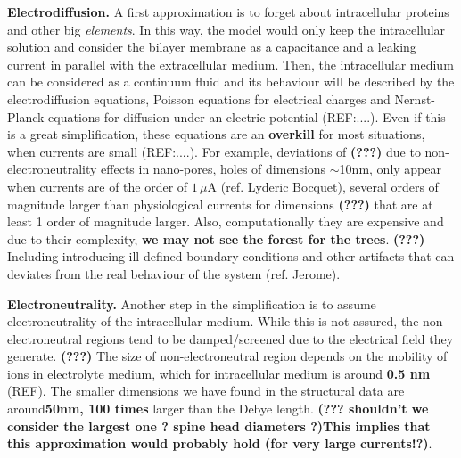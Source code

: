 \documentclass[10pt,letterpaper]{article}
\begin{document}
{\bf Electrodiffusion.} A first approximation is to forget about intracellular proteins and other big \emph{elements}. In this way, the model would only keep the intracellular solution and consider the bilayer membrane as a capacitance and a leaking current in parallel with the extracellular medium. Then, the intracellular medium can be considered as a continuum fluid and its behaviour will be described by the electrodiffusion equations, Poisson equations for electrical charges and Nernst-Planck equations for diffusion under an electric potential (REF:....). 
Even if this is  a great simplification, these equations are an {\bf overkill} for most situations, when currents are small (REF:....). For example, deviations of \textbf{(???)} due to non-electroneutrality effects in nano-pores, holes of dimensions $\sim$10nm, only appear when currents are of the order of $1\,\mu$A (ref. Lyderic Bocquet), several orders of magnitude larger than physiological currents for dimensions \textbf{(???)} that are at least 1 order of magnitude larger. Also, computationally they are expensive and due to their complexity, {\bf  we may not see the forest for the trees}. \textbf{(???)} Including introducing ill-defined boundary conditions and other artifacts that can deviates from the real behaviour of the system (ref. Jerome). 

{\bf Electroneutrality.} Another step in the simplification is to assume electroneutrality of the intracellular medium. While this is not assured, the non-electroneutral regions tend to be damped/screened due to the electrical field they generate. \textbf{(???)} The size of non-electroneutral region depends on the mobility of ions in electrolyte medium, which for intracellular medium is around {\bf 0.5 nm} (REF).
The smaller dimensions we have found in the structural data are around{\bf 50nm, 100 times} larger than the Debye length. \textbf{(??? shouldn't we consider the largest one ? spine head diameters ?)}{\bf This implies that this approximation would probably hold (for very large currents!?)}. 
\end{document}
